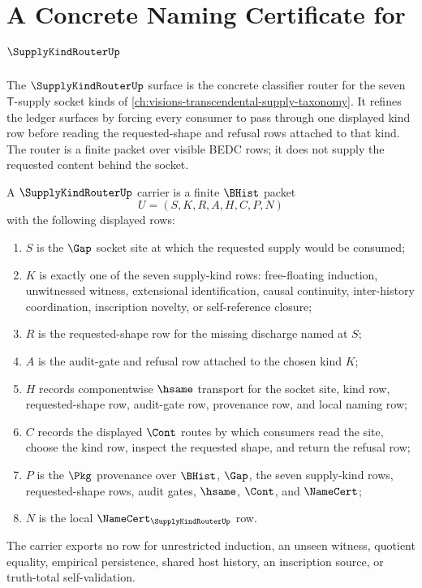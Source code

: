 \chapter{A Concrete Naming Certificate for $\SupplyKindRouterUp$}
\label{ch:concrete-instances-supply-kind-router-namecert}

The $\SupplyKindRouterUp$ surface is the concrete classifier router for the seven $\mathsf{T}$-supply socket kinds of \autoref{ch:visions-transcendental-supply-taxonomy}. It refines the ledger surfaces by forcing every consumer to pass through one displayed kind row before reading the requested-shape and refusal rows attached to that kind. The router is a finite packet over visible BEDC rows; it does not supply the requested content behind the socket.

\begin{definition}
\label{def:supply-kind-router-carrier}
A $\SupplyKindRouterUp$ carrier is a finite $\BHist$ packet
$$
U=(S,K,R,A,H,C,P,N)
$$
with the following displayed rows:
\begin{enumerate}
\item $S$ is the $\Gap$ socket site at which the requested supply would be consumed;
\item $K$ is exactly one of the seven supply-kind rows: free-floating induction, unwitnessed witness, extensional identification, causal continuity, inter-history coordination, inscription novelty, or self-reference closure;
\item $R$ is the requested-shape row for the missing discharge named at $S$;
\item $A$ is the audit-gate and refusal row attached to the chosen kind $K$;
\item $H$ records componentwise $\hsame$ transport for the socket site, kind row, requested-shape row, audit-gate row, provenance row, and local naming row;
\item $C$ records the displayed $\Cont$ routes by which consumers read the site, choose the kind row, inspect the requested shape, and return the refusal row;
\item $P$ is the $\Pkg$ provenance over $\BHist$, $\Gap$, the seven supply-kind rows, requested-shape rows, audit gates, $\hsame$, $\Cont$, and $\NameCert$;
\item $N$ is the local $\NameCert_{\SupplyKindRouterUp}$ row.
\end{enumerate}
The carrier exports no row for unrestricted induction, an unseen witness, quotient equality, empirical persistence, shared host history, an inscription source, or truth-total self-validation.
\end{definition}

